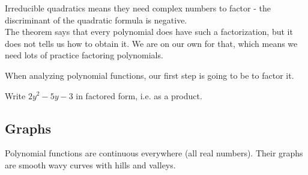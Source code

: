 \documentclass{ximera}
\begin{document}
Irreducible quadratics means they need complex numbers to factor - the discriminant of the quadratic formula is negative. \\



The theorem says that every polynomial does have such a factorization, but it does not tells us how to obtain it.  We are on our own for that, which means we need lots of practice factoring polynomials.

When analyzing polynomial functions, our first step is going to be to factor it.







\begin{question}

Write $2y^2-5y-3$ in factored form, i.e. as a product.



\begin{multipleChoice}
\end{multipleChoice}

\end{question}




























\subsection {Graphs}




Polynomial functions are continuous everywhere (all real numbers).  Their graphs are smooth wavy curves with hills and valleys.
\end{document}
